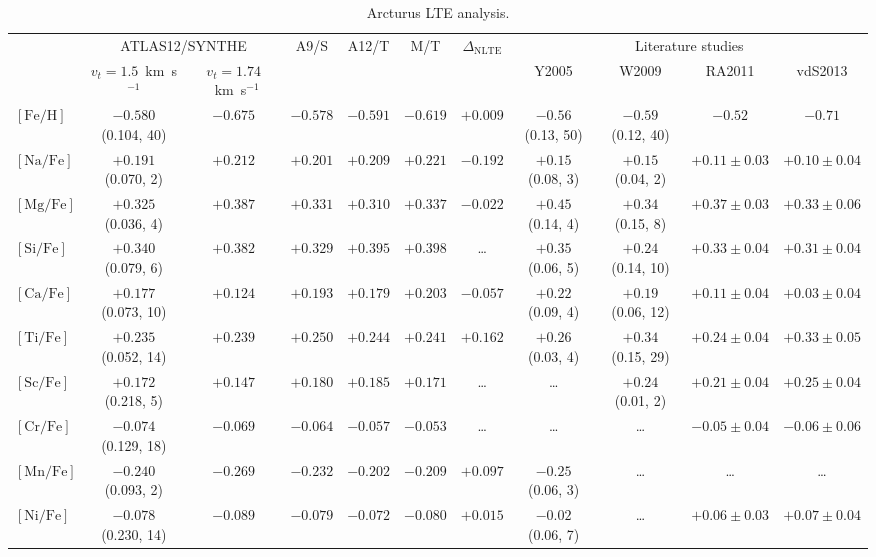 \documentclass{aa}
\begin{document}
\begin{table*}
\caption{Arcturus LTE analysis.}
\label{tab:arcturus}
\centering
\begin{adjustbox}{width=1\textwidth}
\begin{tabular}{l c c c c c c c c c c}
\hline\hline
 & \multicolumn{2}{c}{ATLAS12/SYNTHE} & A9/S & A12/T & M/T & $\Delta_\mathrm{NLTE}$ & \multicolumn{4}{c}{Literature studies} \\
 & $v_t=1.5$~km~s$^{-1}$ & $v_t=1.74$~km~s$^{-1}$ & & & & & Y2005  & W2009 & RA2011 & vdS2013 \\
\hline
$\mathrm{[Fe/H]}$ & $-0.580$ (0.104, 40) & $-0.675$ & $-0.578$ & $-0.591$ & $-0.619$ & $+0.009$ & $-0.56$ (0.13, 50) &  $-0.59$ (0.12, 40) & $-0.52$ & $-0.71$ \\
$\mathrm{[Na/Fe]}$ & $+0.191$ (0.070, 2) & $+0.212$  & $+0.201$ & $+0.209$ & $+0.221$ & $-0.192$ & $+0.15$ (0.08, 3) &  $+0.15$ (0.04, 2) & $+0.11\pm0.03$ & $+0.10\pm0.04$ \\
$\mathrm{[Mg/Fe]}$ & $+0.325$ (0.036, 4) & $+0.387$ & $+0.331$ & $+0.310$ & $+0.337$ & $-0.022$ & $+0.45$ (0.14, 4) &  $+0.34$ (0.15, 8) & $+0.37\pm0.03$ & $+0.33\pm0.06$ \\
$\mathrm{[Si/Fe]}$ & $+0.340$ (0.079, 6) & $+0.382$  & $+0.329$ & $+0.395$ & $+0.398$ & \ldots & $+0.35$ (0.06, 5) &  $+0.24$ (0.14, 10) & $+0.33\pm0.04$ & $+0.31\pm0.04$ \\
$\mathrm{[Ca/Fe]}$ & $+0.177$ (0.073, 10) & $+0.124$  & $+0.193$ & $+0.179$ & $+0.203$ & $-0.057$ & $+0.22$ (0.09, 4) &  $+0.19$ (0.06, 12) & $+0.11\pm0.04$ & $+0.03\pm0.04$ \\
$\mathrm{[Ti/Fe]}$ & $+0.235$  (0.052, 14) & $+0.239$  & $+0.250$ & $+0.244$ & $+0.241$ & $+0.162$ & $+0.26$ (0.03, 4) &  $+0.34$ (0.15, 29) & $+0.24\pm0.04$ & $+0.33\pm0.05$ \\
$\mathrm{[Sc/Fe]}$ & $+0.172$ (0.218, 5) & $+0.147$  & $+0.180$ & $+0.185$ & $+0.171$ & \ldots & \ldots & $+0.24$ (0.01, 2) & $+0.21\pm0.04$ & $+0.25\pm0.04$ \\
$\mathrm{[Cr/Fe]}$ & $-0.074$ (0.129, 18) & $-0.069$  & $-0.064$ & $-0.057$ & $-0.053$ & \ldots & \ldots & \ldots & $-0.05\pm0.04$ & $-0.06\pm0.06$ \\
$\mathrm{[Mn/Fe]}$ & $-0.240$ (0.093, 2) & $-0.269$  & $-0.232$ & $-0.202$ & $-0.209$ & $+0.097$ & $-0.25$ (0.06, 3) & \ldots & \ldots & \ldots \\
$\mathrm{[Ni/Fe]}$ & $-0.078$ (0.230, 14) & $-0.089$  & $-0.079$ & $-0.072$ & $-0.080$ & $+0.015$ & $-0.02$ (0.06, 7) &  \ldots & $+0.06\pm0.03$ & $+0.07\pm0.04$ \\

\end{tabular}
\end{adjustbox}
\end{table*}
\end{document}
